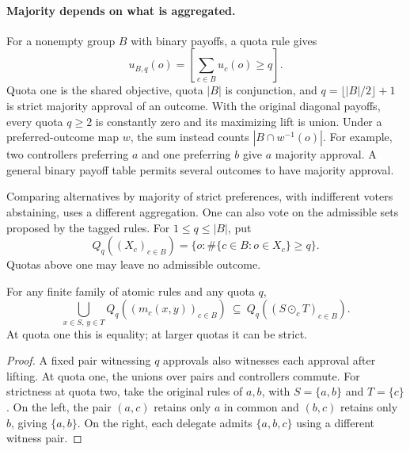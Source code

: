 \paragraph{Majority depends on what is aggregated.}
For a nonempty group $B$ with binary payoffs, a quota rule gives
\[
 u_{B,q}(o)=\left[\sum_{c\in B}u_c(o)\geq q\right].
\]
Quota one is the shared objective, quota $|B|$ is conjunction, and
$q=\lfloor|B|/2\rfloor+1$ is strict majority approval of an outcome.
With the original diagonal payoffs, every quota $q\geq2$ is constantly
zero and its maximizing lift is union. Under a preferred-outcome map
$w$, the sum instead counts $|B\cap w^{-1}(o)|$. For example, two
controllers preferring $a$ and one preferring $b$ give $a$ majority
approval. A general binary payoff table permits several outcomes to
have majority approval.

Comparing alternatives by majority of strict preferences, with
indifferent voters abstaining, uses a different aggregation.
One can also vote on the admissible sets proposed by the tagged
rules. For $1\leq q\leq|B|$, put
\[
 Q_q((X_c)_{c\in B})=\{o:\#\{c\in B:o\in X_c\}\geq q\}.
\]
Quotas above one may leave no admissible outcome.

\begin{lemma}\label{context:lem:aggregation-lift}
For any finite family of atomic rules and any quota $q$,
\[
 \bigcup_{x\in S,\,y\in T}Q_q((m_c(x,y))_{c\in B})
 \ \subseteq\ Q_q((S\odot_c T)_{c\in B}).
\]
At quota one this is equality; at larger quotas it can be strict.
\end{lemma}
\begin{proof}
A fixed pair witnessing $q$ approvals also witnesses each approval
after lifting. At quota one, the unions over pairs and controllers
commute. For strictness at quota two, take the original rules of
$a,b$, with $S=\{a,b\}$ and $T=\{c\}$. On the left, the pair
$(a,c)$ retains only $a$ in common and $(b,c)$ retains only $b$,
giving $\{a,b\}$. On the right, each delegate admits
$\{a,b,c\}$ using a different witness pair.
\end{proof}


